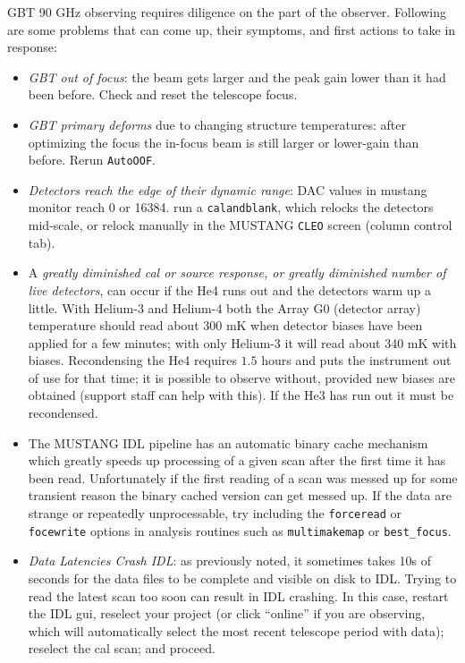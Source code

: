 GBT 90 GHz observing requires
diligence on the part of the observer. Following are some problems
that can come up, their symptoms, and first actions to take in
response:
\begin{itemize}

\item {\it GBT out of focus}: the beam gets larger and the peak gain lower than it had been before.
Check and reset the telescope focus.

\item {\it GBT primary deforms} due to changing structure temperatures: after
optimizing the focus the in-focus beam is still larger or lower-gain than
before. Rerun {\tt AutoOOF}.

\item {\it Detectors reach the edge of their dynamic range}: DAC values in
mustang monitor reach 0 or 16384. run a {\tt calandblank}, which
relocks the detectors mid-scale, or relock manually in the MUSTANG
{\tt CLEO} screen (column control tab).

\item A {\it greatly diminished cal or source response, or greatly diminished number
of live detectors}, can occur if the He4 runs out and the detectors
warm up a little.  With Helium-3 and Helium-4 both the Array G0
(detector array) temperature should read about 300 mK when detector
biases have been applied for a few minutes; with only Helium-3 it will
read about 340 mK with biases. Recondensing the He4 requires $1.5$
hours and puts the instrument out of use for that time; it is possible
to observe without, provided new biases are obtained (support staff
can help with this). If the He3 has run out it must be recondensed.

\item The MUSTANG IDL pipeline has an automatic binary cache mechanism which
greatly speeds up processing of a given scan after the first time it has been read. 
Unfortunately if the first reading of a scan was messed up for some transient
reason the binary cached version can get messed up. If the data are strange or
repeatedly unprocessable, try including the {\tt forceread} or {\tt focewrite}
options in analysis routines such as {\tt multimakemap} or {\tt best\_focus}.

\item {\it Data Latencies Crash IDL}: as previously noted, it sometimes takes 10s of seconds
for the data files to be complete and visible on disk to IDL. Trying
to read the latest scan too soon can result in IDL crashing.  In this
case, restart the IDL gui, reselect your project (or click ``online''
if you are observing, which will automatically select the most recent
telescope period with data); reselect the cal scan; and proceed.

\end{itemize}

